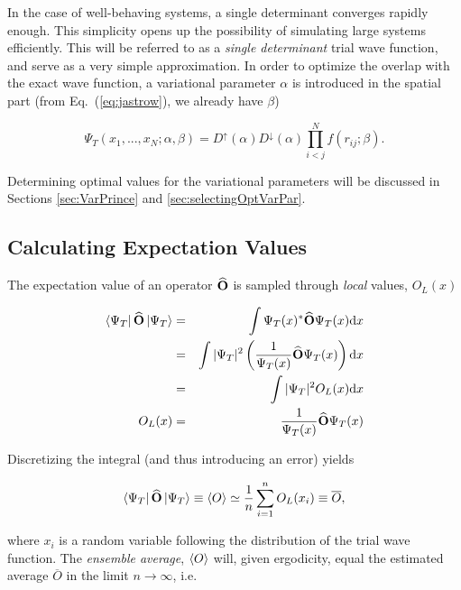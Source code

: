 In the case of well-behaving systems, a single determinant converges rapidly enough. This simplicity opens up the possibility of simulating large systems efficiently. This will be referred to as a \textit{single determinant} trial wave function, and serve as a  very simple approximation. In order to optimize the overlap with the exact wave function, a variational parameter $\alpha$ is introduced in the spatial part (from  Eq.~(\ref{eq:jastrow}), we already have $\beta$)

\begin{equation}
\label{eq:singleDeterminantTWF}
 \Psi_T(x_1, ..., x_N; \alpha, \beta) = D^\uparrow(\alpha)D^\downarrow(\alpha)\prod_{i<j}^Nf(r_{ij}; \beta).
\end{equation}

Determining optimal values for the variational parameters will be discussed in Sections \ref{sec:VarPrince} and \ref{sec:selectingOptVarPar}.

\subsection{Calculating Expectation Values}

The expectation value of an operator ${\bf\widehat{O}}$ is sampled through \textit{local} values, $O_L(x)$

\begin{eqnarray}
 \left< \Psi_T \right|{\bf\widehat{O}}\left| \Psi_T \right> &=& \int \Psi_T(x)^\ast {\bf\widehat{O}} \Psi_T(x)\mathrm{d}x \nonumber\\
                                &=& \int |\Psi_T|^2\left(\frac{1}{\Psi_T(x)}{\bf\widehat{O}}\Psi_T(x)\right)\mathrm{d}x \nonumber\\
                                &=& \int |\Psi_T|^2 O_L(x)\mathrm{d}x \\
                         O_L(x) &=& \frac{1}{\Psi_T(x)}{\bf\widehat{O}}\Psi_T(x)           
\end{eqnarray}

Discretizing the integral (and thus introducing an error) yields 

\begin{equation}
 \left< \Psi_T \right|{\bf\widehat{O}}\left| \Psi_T \right> \equiv \left< O \right> \simeq \frac{1}{n}\sum_{i=1}^n O_L(x_i) \equiv \overline{O},
\end{equation}

where $x_i$ is a random variable following the distribution of the trial wave function. The \textit{ensemble average},  $\left< O \right>$ will, given ergodicity, equal the estimated average $\overline{O}$ in the limit $n\rightarrow\infty$, i.e.

